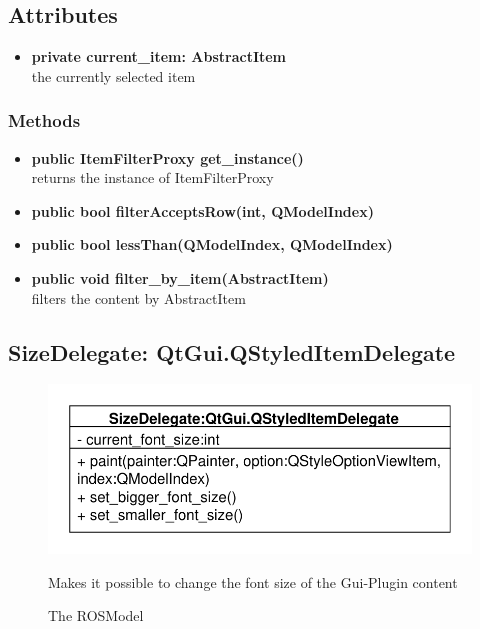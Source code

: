 \subsection{Attributes}
\begin{itemize}
  \item \textbf{private current\_item: AbstractItem}\\
  the currently selected item
\end{itemize}
\subsubsection{Methods}
\begin{itemize}
  
  \item \textbf{public ItemFilterProxy get\_instance()}\\
  returns the instance of ItemFilterProxy
  \item \textbf{public bool filterAcceptsRow(int, QModelIndex)}\\
  
  \item \textbf{public bool lessThan(QModelIndex, QModelIndex)}\\
  
  \item \textbf{public void filter\_by\_item(AbstractItem)}\\
  filters the content by AbstractItem
\end{itemize}

\subsection{SizeDelegate: QtGui.QStyledItemDelegate}
\begin{figure}[htbp]
	\begin{minipage}[t]{7cm}
		\vspace{0pt}
		\centering
		\includegraphics[scale=0.6]{./diagram_pictures/SizeDelegate.pdf}
		\caption{The ROSModel}
	\end{minipage}
	\hfill
	\begin{minipage}[t]{7cm}
		\vspace{10pt}
		Makes it possible to change the font size of the Gui-Plugin content
	\end{minipage}
\end{figure} 
